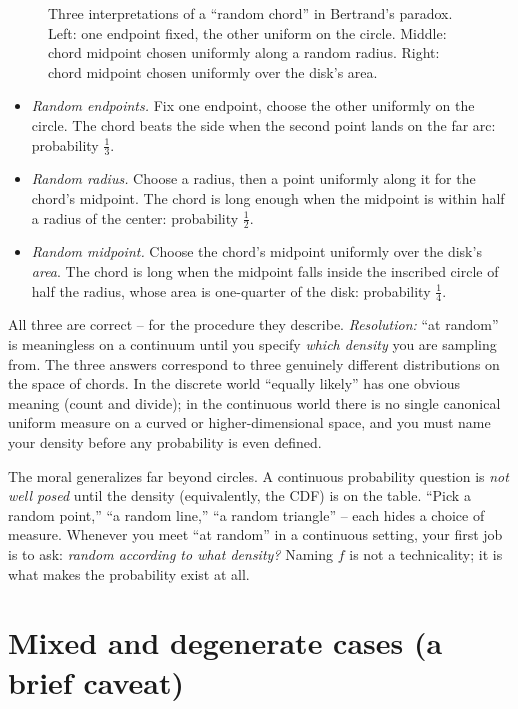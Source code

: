 \begin{paradoxbox}
\begin{figure}[H]
\begin{tikzpicture}
\end{tikzpicture}
\caption{Three interpretations of a ``random chord'' in Bertrand's paradox. Left: one endpoint fixed, the other uniform on the circle. Middle: chord midpoint chosen uniformly along a random radius. Right: chord midpoint chosen uniformly over the disk's area.}
\label{ch10:fig-bertrand}
\end{figure}
\begin{itemize}
\item \emph{Random endpoints.} Fix one endpoint, choose the other uniformly on the
      circle. The chord beats the side when the second point lands on the far arc:
      probability $\tfrac{1}{3}$.
\item \emph{Random radius.} Choose a radius, then a point uniformly along it for the
      chord's midpoint. The chord is long enough when the midpoint is within half a
      radius of the center: probability $\tfrac{1}{2}$.
\item \emph{Random midpoint.} Choose the chord's midpoint uniformly over the disk's
      \emph{area}. The chord is long when the midpoint falls inside the inscribed
      circle of half the radius, whose area is one-quarter of the disk: probability
      $\tfrac{1}{4}$.
\end{itemize}
All three are correct -- for the procedure they describe. \emph{Resolution:} ``at
random'' is meaningless on a continuum until you specify \emph{which density} you are
sampling from. The three answers correspond to three genuinely different
distributions on the space of chords. In the discrete world ``equally likely'' has
one obvious meaning (count and divide); in the continuous world there is no single
canonical uniform measure on a curved or higher-dimensional space, and you must name
your density before any probability is even defined.
\end{paradoxbox}

\begin{happeningbox}
The moral generalizes far beyond circles. A continuous probability question is
\emph{not well posed} until the density (equivalently, the CDF) is on the table.
``Pick a random point,'' ``a random line,'' ``a random triangle'' -- each hides a
choice of measure. Whenever you meet ``at random'' in a continuous setting, your
first job is to ask: \emph{random according to what density?} Naming $f$ is not a
technicality; it is what makes the probability exist at all.
\end{happeningbox}

\section{Mixed and degenerate cases (a brief caveat)}
\label{ch10:mixed}

